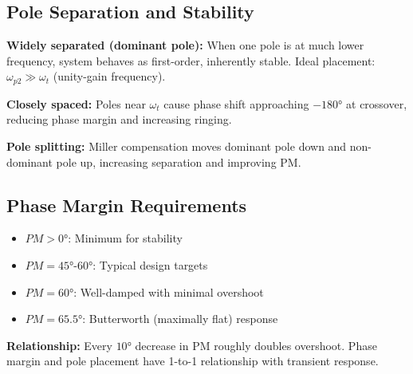 \documentclass[main.tex]{subfiles}
\begin{document}
\subsection*{Pole Separation and Stability}

\textbf{Widely separated (dominant pole):} When one pole is at much lower frequency, system behaves as first-order, inherently stable. Ideal placement: $\omega_{p2} \gg \omega_t$ (unity-gain frequency).

\textbf{Closely spaced:} Poles near $\omega_t$ cause phase shift approaching $-180°$ at crossover, reducing phase margin and increasing ringing.

\textbf{Pole splitting:} Miller compensation moves dominant pole down and non-dominant pole up, increasing separation and improving PM.

\subsection*{Phase Margin Requirements}

\begin{itemize}
    \item $PM > 0°$: Minimum for stability
    \item $PM = 45°$-$60°$: Typical design targets
    \item $PM = 60°$: Well-damped with minimal overshoot
    \item $PM = 65.5°$: Butterworth (maximally flat) response
\end{itemize}

\textbf{Relationship:} Every $10°$ decrease in PM roughly doubles overshoot. Phase margin and pole placement have 1-to-1 relationship with transient response.
\end{document}
